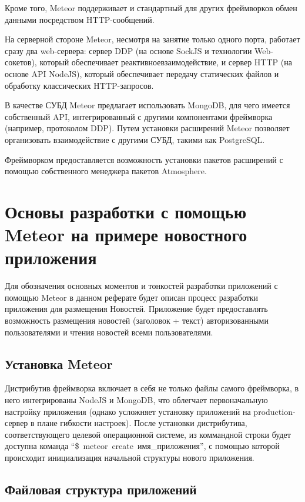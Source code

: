 \documentclass[a4paper,12pt]{article}
\begin{document}
Кроме того, Meteor поддерживает и стандартный для других фреймворков обмен данными
посредством HTTP-сообщений.

На серверной стороне Meteor, несмотря на занятие только одного порта,
работает сразу два web-сервера: сервер DDP (на основе SockJS и технологии
Web-сокетов), который обеспечивает реактивноевзаимодействие, и сервер HTTP (на
основе API NodeJS), который обеспечивает передачу статических файлов и
обработку классических HTTP-запросов.

В качестве СУБД Meteor предлагает использовать MongoDB, для чего имеется
собственный API, интегрированный с другими компонентами фреймворка (например,
протоколом DDP). Путем установки расширений Meteor позволяет организовать 
взаимодействие с другими СУБД, такими как PostgreSQL.

Фреймворком предоставляется возможность установки пакетов расширений
с помощью собственного менеджера пакетов Atmosphere.

\section{Основы разработки с помощью Meteor на примере новостного приложения}
Для обозначения основных моментов и тонкостей разработки приложений с помощью
Meteor в данном реферате будет описан процесс разработки приложения для размещения
Новостей. Приложение будет предоставлять возможность размещения новостей
(заголовок + текст) авторизованными пользователями и чтения новостей
всеми пользователями.

\subsection{Установка Meteor}

Дистрибутив фреймворка включает в себя не только файлы самого фреймворка, 
в него интегрированы NodeJS и MongoDB, что облегчает
первоначальную настройку приложения (однако усложняет установку приложений 
на production-сервер в плане гибкости настроек). После
установки дистрибутива, соответствующего целевой операционной системе,
из коммандной строки будет доступна команда ``\$~meteor~create~имя\_приложения'',
с помощью которой происходит инициализация начальной структуры нового приложения.

\subsection{Файловая структура приложений}
\end{document}
